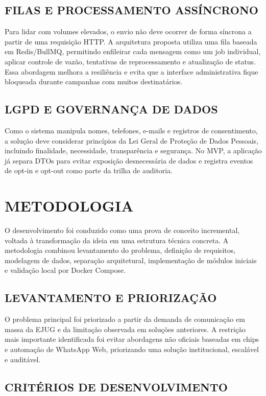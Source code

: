 \documentclass[12pt,letterpaper,oneside]{report}
\begin{document}
\section{FILAS E PROCESSAMENTO ASSÍNCRONO}

Para lidar com volumes elevados, o envio não deve ocorrer de forma síncrona a partir de uma requisição HTTP. A arquitetura proposta utiliza uma fila baseada em Redis/BullMQ, permitindo enfileirar cada mensagem como um job individual, aplicar controle de vazão, tentativas de reprocessamento e atualização de status. Essa abordagem melhora a resiliência e evita que a interface administrativa fique bloqueada durante campanhas com muitos destinatários.

\section{LGPD E GOVERNANÇA DE DADOS}

Como o sistema manipula nomes, telefones, e-mails e registros de consentimento, a solução deve considerar princípios da Lei Geral de Proteção de Dados Pessoais, incluindo finalidade, necessidade, transparência e segurança. No MVP, a aplicação já separa DTOs para evitar exposição desnecessária de dados e registra eventos de opt-in e opt-out como parte da trilha de auditoria.

\chapter{METODOLOGIA}

O desenvolvimento foi conduzido como uma prova de conceito incremental, voltada à transformação da ideia em uma estrutura técnica concreta. A metodologia combinou levantamento do problema, definição de requisitos, modelagem de dados, separação arquitetural, implementação de módulos iniciais e validação local por Docker Compose.

\section{LEVANTAMENTO E PRIORIZAÇÃO}

O problema principal foi priorizado a partir da demanda de comunicação em massa da EJUG e da limitação observada em soluções anteriores. A restrição mais importante identificada foi evitar abordagens não oficiais baseadas em chips e automação de WhatsApp Web, priorizando uma solução institucional, escalável e auditável.

\section{CRITÉRIOS DE DESENVOLVIMENTO}
\end{document}
